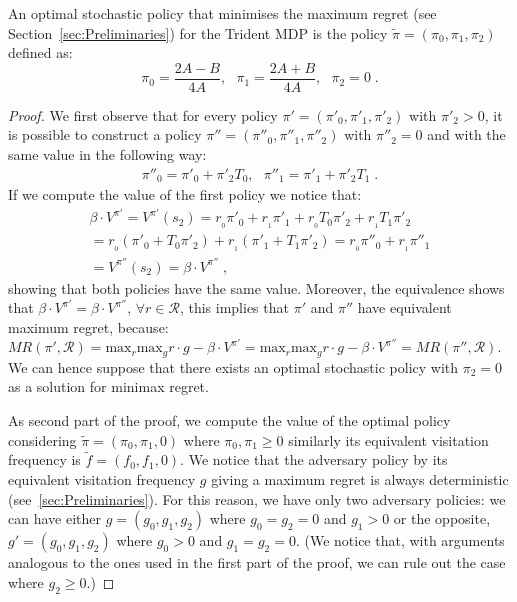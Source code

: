\begin{proposition}\label{theorem:opt_stoc}
An optimal stochastic policy that minimises the maximum regret (see Section~\ref{sec:Preliminaries}) for the Trident MDP is the policy $\tilde{\pi} = (\pi_0, \pi_1, \pi_2)$ defined as:
$$\pi_{0}=\dfrac{2A - B}{4A},~~~\pi_{1}=\dfrac{2A + B}{4A}, ~~~\pi_2 = 0\;.$$
\end{proposition}
\begin{proof}
We first observe that for every policy $\pi' = (\pi'_0, \pi'_1, \pi'_2)$ with $\pi'_2 > 0$, it is possible to construct a policy $\pi'' = (\pi''_0, \pi''_1, \pi''_2)$ with $\pi''_2 = 0$ and with the same value in the following way:
\begin{align*}
\pi''_0 = \pi'_0 + \pi'_2 T_0, ~~~ \pi''_1 = \pi'_1 + \pi'_2 T_1\;.
\end{align*}
If we compute the value of the first policy we notice that:
\begin{align*}
\beta \cdot V^{\pi'} = V^{\pi'}(s_2) =
r_{_0} \pi'_0 + r_{_1}\pi'_1 + r_{_0} T_0 \pi'_2 + r_{_1} T_1 \pi'_2 \\
= r_{_0} (\pi'_0 + T_0 \pi'_2) + r_{_1} (\pi'_1 + T_1 \pi'_2)
= r_{_0} \pi''_0 + r_{_1}\pi''_1  \\
= V^{\pi''}(s_2) =\beta \cdot V^{\pi''}\;,
\end{align*}
showing that both policies have the same value.
Moreover, the equivalence shows that  $\beta \cdot V^{\pi'}= \beta \cdot V^{\pi''}$, $\forall r \in \mathcal{R}$,
this implies that
$\pi'$ and $\pi''$ have equivalent maximum regret, because: $MR(\pi', \mathcal{R}) = \text{max}_{r} \text{max}_g r \cdot g - \beta \cdot V^{\pi'} = \text{max}_{r} \text{max}_g r \cdot g - \beta \cdot V^{\pi''} = MR(\pi'', \mathcal{R})$.
We can hence suppose that there exists an optimal stochastic policy with $\pi_2 =0$ as a solution for minimax regret. 

As second part of the proof, we compute the value of the optimal policy considering $\tilde{\pi} = (\pi_0, \pi_1, 0)$ where $\pi_0, \pi_1 \geq 0$ similarly its equivalent visitation frequency is $\tilde{f} = (f_0, f_1, 0)$. 
We notice that the adversary policy by its equivalent visitation frequency $g$ giving a maximum regret is always deterministic (see~\ref{sec:Preliminaries}). For this reason, we have only two adversary policies: we can have either $g = (g_0, g_1, g_2)$ where $g_0 = g_2=0$ and $g_1 > 0$ or the opposite, $g' = (g_0, g_1, g_2)$ where $g_0>0$ and $g_1 = g_2 = 0$. (We notice that, with arguments analogous to the ones used in the first part of the proof, we can rule out the case where $g_2 \geq 0$.)


\end{proof}
